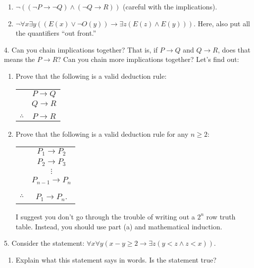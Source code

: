 \documentclass[10pt,]{book}
\theoremstyle{plain}
\theoremstyle{definition}
\theoremstyle{definition}
\theoremstyle{definition}
\numberwithin{equation}{chapter}
\newcommand{\hrulethin}  {\noalign{\hrule height 0.04em}}
\def\imp{\rightarrow}
\newcommand{\lt}{ < }
\begin{document}
\begin{exerciselist}
\begin{enumerate}[label=(\alph*)]
\item\hypertarget{li-1182}{}\(\neg((\neg P \imp \neg Q) \wedge (\neg Q \imp R))\) (careful with the implications).

\item\hypertarget{li-1183}{}\(\neg \forall x \exists y ((E(x) \vee \neg O(y)) \imp \exists z (E(z) \wedge E(y)))\). Here, also put all the quantifiers ``out front.''%
\end{enumerate}
\par\smallskip
\item[4.]\hypertarget{exercise-258}{}
            Can you chain implications together? That is, if \(P \imp Q\) and \(Q \imp R\), does that means the \(P \imp R\)? Can you chain more implications together? Let's find out:
\leavevmode%
\begin{enumerate}[label=(\alph*)]
\item\hypertarget{li-1184}{}
                Prove that the following is a valid deduction rule:
                \leavevmode%
\begin{table}
\centering
\begin{tabular}{cc}
&\(P \imp Q\)\tabularnewline[0pt]
&\(Q \imp R\)\tabularnewline[0pt]
&\tabularnewline\hrulethin
\(\therefore\)&\(P \imp R\)
\end{tabular}
\end{table}


\item\hypertarget{li-1185}{}
                Prove that the following is a valid deduction rule for any \(n \ge 2\):
                \leavevmode%
\begin{table}
\centering
\begin{tabular}{cc}
&\(P_1 \imp P_2\)\tabularnewline[0pt]
&\(P_2 \imp P_3\)\tabularnewline[0pt]
&\(\vdots\)\tabularnewline[0pt]
&\(P_{n-1} \imp P_n\)\tabularnewline[0pt]
&\tabularnewline\hrulethin
\(\therefore\)&\(P_1 \imp P_n\).
\end{tabular}
\end{table}

                I suggest you don't go through the trouble of writing out a \(2^n\) row truth table. Instead, you should use part (a) and mathematical induction.


\end{enumerate}
\par\smallskip
\item[5.]\hypertarget{exercise-259}{}
            Consider the statement: \(\forall x \forall y (x-y \ge 2 \imp \exists z (y \lt  z \wedge z \lt  x))\).
\leavevmode%
\begin{enumerate}[label=(\alph*)]
\item\hypertarget{li-1186}{}
                Explain what this statement says in words. Is the statement true?



\end{enumerate}
\end{exerciselist}
\end{document}
